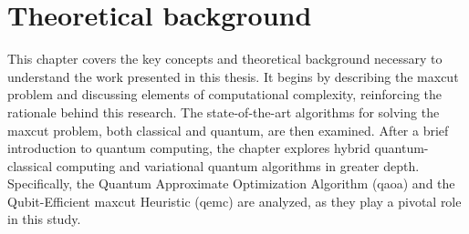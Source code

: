 \raggedbottom

\chapter{Theoretical background}
\label{chapter:Background}

This chapter covers the key concepts and theoretical background necessary to understand the work presented in this thesis. It begins by describing the \acrshort{maxcut} problem and discussing elements of computational complexity, reinforcing the rationale behind this research. The state-of-the-art algorithms for solving the \acrshort{maxcut} problem, both classical and quantum, are then examined. After a brief introduction to quantum computing, the chapter explores hybrid quantum-classical computing and variational quantum algorithms in greater depth. Specifically, the Quantum Approximate Optimization Algorithm (\acrshort{qaoa}) and the Qubit-Efficient \acrshort{maxcut} Heuristic (\acrshort{qemc}) are analyzed, as they play a pivotal role in this study.







